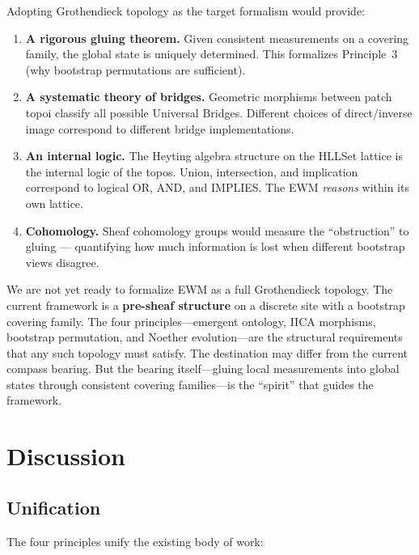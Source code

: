 \documentclass[11pt,a4paper]{article}
\theoremstyle{remark}
\begin{document}
Adopting Grothendieck topology as the target formalism would provide:

\begin{enumerate}[leftmargin=*,nosep]
  \item \textbf{A rigorous gluing theorem.} Given consistent measurements on a covering
    family, the global state is uniquely determined. This formalizes Principle~3 (why
    bootstrap permutations are sufficient).
  \item \textbf{A systematic theory of bridges.} Geometric morphisms between patch
    topoi classify all possible Universal Bridges. Different choices of direct/inverse
    image correspond to different bridge implementations.
  \item \textbf{An internal logic.} The Heyting algebra structure on the HLLSet lattice
    is the internal logic of the topos. Union, intersection, and implication correspond
    to logical OR, AND, and IMPLIES. The EWM \textit{reasons} within its own lattice.
  \item \textbf{Cohomology.} Sheaf cohomology groups would measure the ``obstruction''
    to gluing --- quantifying how much information is lost when different bootstrap views
    disagree.
\end{enumerate}

We are not yet ready to formalize EWM as a full Grothendieck topology. The current
framework is a \textbf{pre-sheaf structure} on a discrete site with a bootstrap covering
family. The four principles---emergent ontology, IICA morphisms, bootstrap permutation,
and Noether evolution---are the structural requirements that any such topology must
satisfy. The destination may differ from the current compass bearing. But the bearing
itself---gluing local measurements into global states through consistent covering
families---is the ``spirit'' that guides the framework.

\section{Discussion}
\label{sec:discussion}

\subsection{Unification}

The four principles unify the existing body of work:
\end{document}
